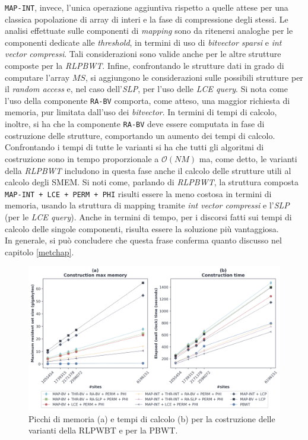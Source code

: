 \texttt{MAP-INT}, invece, l'unica operazione aggiuntiva rispetto a quelle attese
per una classica popolazione di array di interi e la fase di compressione degli
stessi. Le analisi effettuate sulle componenti di \textit{mapping} sono da
ritenersi analoghe per le componenti dedicate alle \textit{threshold}, in
termini di uso di \textit{bitvector sparsi} e \textit{int vector
  compressi}. Tali considerazioni sono valide anche per le altre strutture
composte per la \textit{RLPBWT}. Infine, confrontando le strutture dati in grado
di computare l'array $MS$, si aggiungono le considerazioni sulle possibili
strutture per il \textit{random access} e, nel caso dell'\textit{SLP}, per l'uso
delle \textit{LCE query}. Si nota come l'uso della componente \texttt{RA-BV}
comporta, come atteso, una maggior richiesta di memoria, pur limitata dall'uso
dei \textit{bitvector}. In termini di tempi di calcolo, inoltre, si ha che la
componente \texttt{RA-BV} deve essere computata in fase di costruzione delle
strutture, comportando un aumento dei tempi di calcolo. Confrontando i tempi di
tutte le varianti si ha che tutti gli algoritmi di costruzione sono in tempo
proporzionale a $\mathcal{O}(NM)$ ma, come detto, le varianti della
\textit{RLPBWT} includono  in questa fase anche il calcolo delle strutture utili
al calcolo degli SMEM. Si noti come, parlando di \textit{RLPBWT}, la struttura
composta \texttt{MAP-INT + LCE + PERM + PHI} risulti essere la meno costosa in
termini di memoria, usando la struttura di mapping tramite \textit{int vector
  compressi} e l'\textit{SLP} (per le \textit{LCE query}). Anche in termini di
tempo, per i discorsi fatti sui tempi di calcolo delle singole componenti,
risulta essere la soluzione più vantaggiosa.\\
In generale, si può 
concludere che questa frase conferma quanto discusso nel capitolo \ref{metchap}.
\begin{figure}
  \centering
  \includegraphics[width=\linewidth]{img/make_time_mem_paper.png}
  \caption{Picchi di memoria (a) e tempi di calcolo (b) per la
    costruzione delle varianti della RLPWBT e per 
    la PBWT.}
  \label{fig:maketimememchr}
\end{figure}
